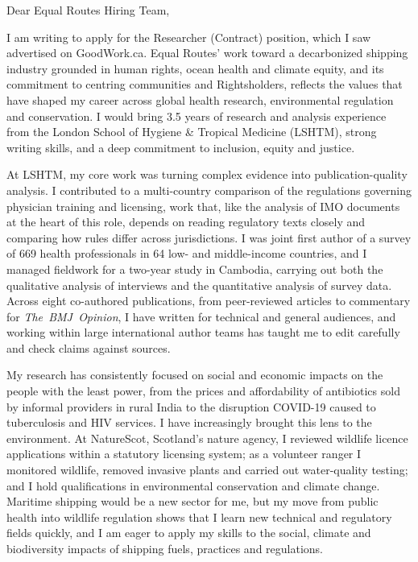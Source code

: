 \documentclass[10pt, letterpaper]{article}
\newcommand*{\lightseries}{\fontseries{l}\selectfont}
\newcommand*{\lettertextstyle}{\fontsize{10.5pt}{14pt}\selectfont\lightseries\color{text}}
\begin{document}
{\lettertextstyle\justifying\setlength{\parskip}{0.75em}

Dear Equal Routes Hiring Team,

I am writing to apply for the Researcher (Contract) position, which I saw advertised on GoodWork.ca. Equal Routes' work toward a decarbonized shipping industry grounded in human rights, ocean health and climate equity, and its commitment to centring communities and Rightsholders, reflects the values that have shaped my career across global health research, environmental regulation and conservation. I would bring 3.5 years of research and analysis experience from the London School of Hygiene \& Tropical Medicine (LSHTM), strong writing skills, and a deep commitment to inclusion, equity and justice.

At LSHTM, my core work was turning complex evidence into publication-quality analysis. I contributed to a multi-country comparison of the regulations governing physician training and licensing, work that, like the analysis of IMO documents at the heart of this role, depends on reading regulatory texts closely and comparing how rules differ across jurisdictions. I was joint first author of a survey of 669 health professionals in 64 low- and middle-income countries, and I managed fieldwork for a two-year study in Cambodia, carrying out both the qualitative analysis of interviews and the quantitative analysis of survey data. Across eight co-authored publications, from peer-reviewed articles to commentary for \mbox{\textit{The BMJ Opinion}}, I have written for technical and general audiences, and working within large international author teams has taught me to edit carefully and check claims against sources.

My research has consistently focused on social and economic impacts on the people with the least power, from the prices and affordability of antibiotics sold by informal providers in rural India to the disruption COVID-19 caused to tuberculosis and HIV services. I have increasingly brought this lens to the environment. At NatureScot, Scotland's nature agency, I reviewed wildlife licence applications within a statutory licensing system; as a volunteer ranger I monitored wildlife, removed invasive plants and carried out water-quality testing; and I hold qualifications in environmental conservation and climate change. Maritime shipping would be a new sector for me, but my move from public health into wildlife regulation shows that I learn new technical and regulatory fields quickly, and I am eager to apply my skills to the social, climate and biodiversity impacts of shipping fuels, practices and regulations.

}
\end{document}
